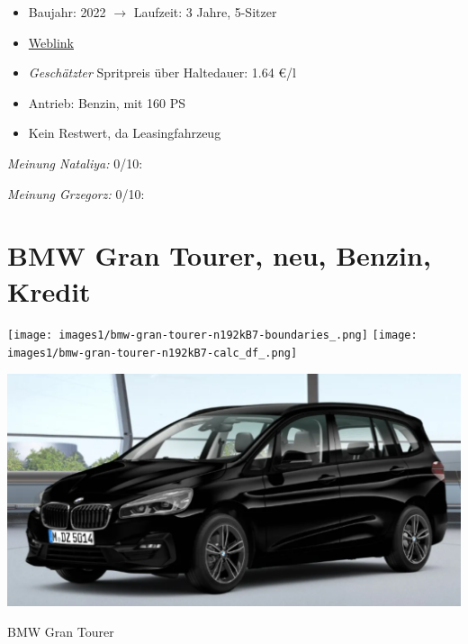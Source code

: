 \documentclass[landscape, DIV=99, 14pt]{scrartcl}
\begin{document}
\begin{itemize}
    \item Baujahr: 2022 $\rightarrow$ Laufzeit: 3 Jahre, 5-Sitzer
    \item \href{https://konfigurator.meinauto.de/kia/neuwagen/cee-d/angebote/cee-d-sporty-wagon/konfigurator/\#!/extras/spirit/8865371/3,11,27/private/109347-4167-291321/1321/61d21ce73c5db/leasing/109348-8088-291322/36,3000,15000,0,0,0,0,0,}{Weblink}
    \item \emph{Gesch\"atzter} Spritpreis \"uber Haltedauer: 1.64 \euro{}/l
    \item Antrieb: Benzin, mit 160 PS
    \item Kein Restwert, da Leasingfahrzeug
\end{itemize}

\begin{small}
\emph{Meinung Nataliya:} 0/10: 
        
\emph{Meinung Grzegorz:} 0/10: 
\end{small}

\pagebreak


\twocolumn

\section*{BMW Gran Tourer, neu, Benzin, Kredit}
\begin{center}
\texttt{[image: images1/bmw-gran-tourer-n192kB7-boundaries\_.png]}
\null
\vspace{0.5cm}
\texttt{[image: images1/bmw-gran-tourer-n192kB7-calc\_df\_.png]}
\end{center}

\pagebreak
\begin{center}
\includegraphics[width=0.9\columnwidth]{cars/bmw-gran-tourer-mulfinger.png}

BMW Gran Tourer
\end{center}
\end{document}
